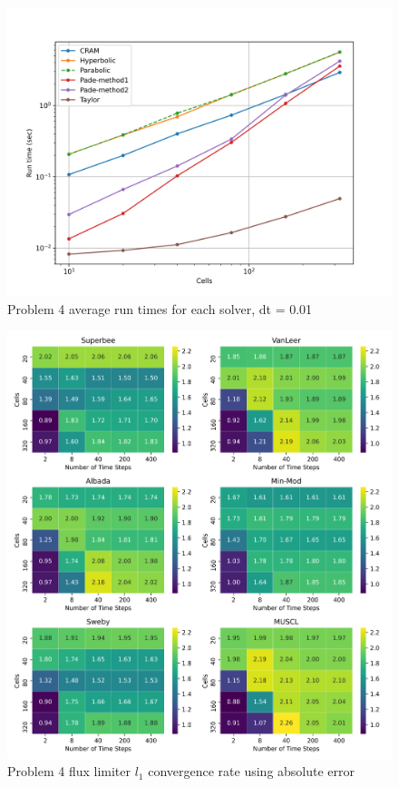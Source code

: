 \clearpage

\begin{figure}[p]
    \centering
    \includegraphics[width=6in]{images/chapter-5/problem4Runtimes.png}
    \caption{Problem 4 average run times for each solver, dt = 0.01}
    \label{fig:problem4_runtimes}
\end{figure}

\clearpage

\begin{figure}[p]
    \centering
    \includegraphics[width=6in]{images/chapter-5/problem4FluxLimiterConvergenceRate.png}
    \caption{Problem 4 flux limiter $l_{1}$ convergence rate using absolute error}
    \label{fig:problem4_fluxlimiter_convergence_rate}
\end{figure}

